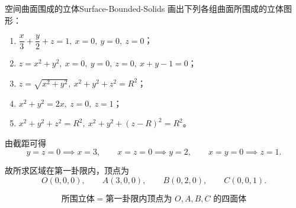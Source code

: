 \begin{problem}{空间曲面围成的立体}{Surface-Bounded-Solids}
    画出下列各组曲面所围成的立体图形：
    \begin{enumerate}
        \item $\dfrac{x}{3}+\dfrac{y}{2}+z=1,\ x=0,\ y=0,\ z=0$；
        \item $z=x^2+y^2,\ x=0,\ y=0,\ z=0,\ x+y-1=0$；
        \item $z=\sqrt{x^2+y^2},\ x^2+y^2+z^2=R^2$；
        \item $x^2+y^2=2x,\ z=0,\ z=1$；
        \item $x^2+y^2+z^2=R^2,\ x^2+y^2+(z-R)^2=R^2$。
    \end{enumerate}
\end{problem}

\begin{solution}

    由截距可得
    \begin{equation*}
        y=z=0 \implies x=3,\qquad x=z=0 \implies y=2,\qquad x=y=0 \implies z=1.
    \end{equation*}

    故所求区域在第一卦限内，顶点为
    \begin{equation*}
        O(0,0,0),\qquad A(3,0,0),\qquad B(0,2,0),\qquad C(0,0,1).
    \end{equation*}

    \begin{center}
    \end{center}

    \begin{equation*}
        \boxed{\text{所围立体}= \text{第一卦限内顶点为 }O,A,B,C\text{ 的四面体}}
    \end{equation*}


\end{solution}
